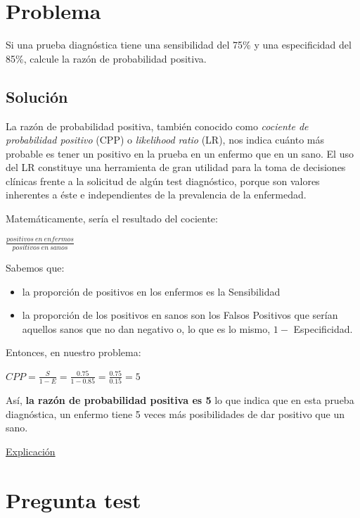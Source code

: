 \documentclass[
]{book}
\providecommand{\tightlist}{%
  \setlength{\itemsep}{0pt}\setlength{\parskip}{0pt}}
\begin{document}
\hypertarget{problema-12}{%
\section{Problema}\label{problema-12}}

Si una prueba diagnóstica tiene una sensibilidad del 75\% y una especificidad del 85\%, calcule la razón de probabilidad positiva.

\hypertarget{soluciuxf3n-9}{%
\subsection{Solución}\label{soluciuxf3n-9}}

La razón de probabilidad positiva, también conocido como \emph{cociente de probabilidad positivo} (CPP) o \emph{likelihood ratio} (LR), nos indica cuánto más probable es tener un positivo en la prueba en un enfermo que en un sano. El uso del LR constituye una herramienta de gran utilidad para la toma de decisiones clínicas frente a la solicitud de algún test diagnóstico, porque son valores inherentes a éste e independientes de la prevalencia de la enfermedad.

Matemáticamente, sería el resultado del cociente:

\(\frac{positivos ~ en ~ enfermos}{positivos ~ en ~ sanos}\)

Sabemos que:

\begin{itemize}
\tightlist
\item
  la proporción de positivos en los enfermos es la Sensibilidad
\item
  la proporción de los positivos en sanos son los Falsos Positivos que serían aquellos sanos que no dan negativo o, lo que es lo mismo, \(1 -\) Especificidad.
\end{itemize}

Entonces, en nuestro problema:

\(CPP= \frac{S}{1-E}= \frac{0.75}{1-0.85}=\frac{0.75}{0.15}=5\)

Así, \textbf{la razón de probabilidad positiva es 5} lo que indica que en esta prueba diagnóstica, un enfermo tiene 5 veces más posibilidades de dar positivo que un sano.

\href{https://www.elsevier.es/es-revista-revista-argentina-radiologia-383-articulo-likelihood-ratio-razon-verosimilitud-definicion-S0048761916301910}{Explicación}

\hypertarget{pregunta-test-153}{%
\section{Pregunta test}\label{pregunta-test-153}}
\end{document}
